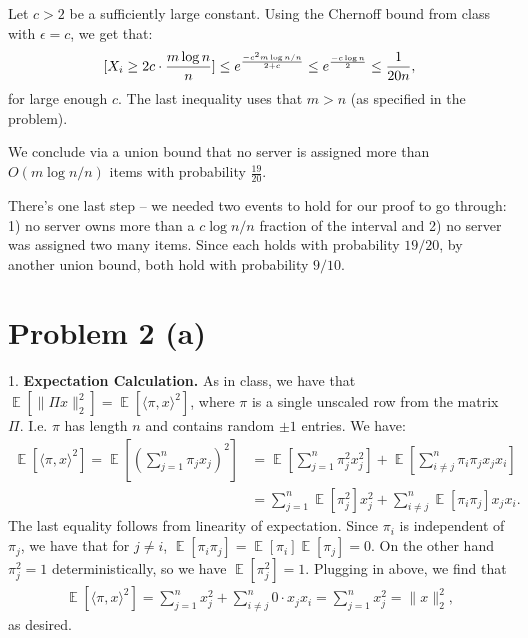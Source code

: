 \documentclass[11pt]{article}
\DeclareMathOperator*{\E}{\mathbb{E}}
\let\Pr\relax
\DeclareMathOperator*{\Pr}{\mathbb{P}}
\begin{document}
	Let $c > 2$ be a sufficiently large constant. Using the Chernoff bound from class with $\epsilon = c$, we get that:
	\begin{align*}
		\Pr[X_i \geq 2c \cdot \frac{m\log n}{n}] \leq e^{\frac{-c^2m\log n / n}{2+c}} \leq e^{\frac{-c\log n}{2}} \leq \frac{1}{20n}, 
	\end{align*}
	for large enough $c$. The last inequality uses that $m > n$ (as specified in the problem).
	
	We conclude via a union bound that no server is assigned more than $O(m\log n /n)$ items with probability $\frac{19}{20}$. 
	
	There's one last step -- we needed two events to hold for our proof to go through: 1) no server owns more than a $c\log n / n$ fraction of the interval and 2) no server was assigned two many items. Since each holds with probability $19/20$, by another union bound, both hold with probability $9/10$.
	
	\section*{Problem 2 (a)}

1. \textbf{Expectation Calculation.} As in class, we have that $\E[\|\Pi x\|_2^2] =  \E[\langle \pi, x\rangle^2]$, where $\pi$ is a single unscaled row from the matrix $\Pi$. I.e. $\pi$ has length $n$ and contains random $\pm 1$ entries. We have:
\begin{align*}
	\E[\langle \pi, x\rangle^2] = \E\left[\left(\sum_{j=1}^n \pi_j x_j \right)^2\right] &= \E\left[\sum_{j=1}^n \pi_j^2 x_j^2\right] + \E\left[\sum_{i\neq j}^n \pi_i\pi_j x_jx_i \right]\\
	&= \sum_{j=1}^n \E\left[\pi_j^2 \right] x_j^2 +\sum_{i\neq j}^n  \E\left[\pi_i\pi_j\right] x_jx_i .
\end{align*}
The last equality follows from linearity of expectation. Since $\pi_i$ is independent of $\pi_j$, we have that for $j\neq i$, $\E\left[\pi_i\pi_j\right] = \E[\pi_i]\E[\pi_j] = 0$. On the other hand $\pi_j^2 = 1$ deterministically, so we have $\E\left[\pi_j^2 \right]  = 1$. Plugging in above, we find that 
\begin{align*}
	\E[\langle \pi, x\rangle^2] = \sum_{j=1}^n x_j^2 +\sum_{i\neq j}^n  0\cdot x_jx_i  =  \sum_{j=1}^n x_j^2 = \|x\|_2^2,
\end{align*}
as desired.
\end{document}
